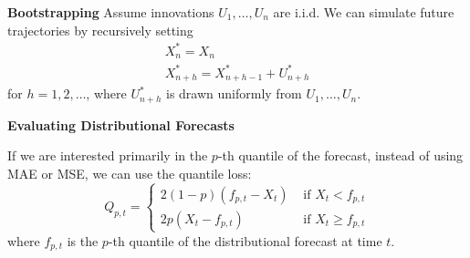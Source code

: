 \documentclass[a4paper]{article}
\newcommand{\subheading}[1]{{\scriptsize\textbf{#1}}}
\begin{document}
\begin{multicols*}{4}
\subheading{Bootstrapping}
Assume innovations $U_{1}, \ldots, U_{n}$ are i.i.d. We can simulate future trajectories by recursively setting
$$
\begin{gathered}
X_{n}^{*}=X_{n} \\
X_{n+h}^{*}=X_{n+h-1}^{*}+U_{n+h}^{*}
\end{gathered}
$$
for $h=1,2, \ldots$, where $U_{n+h}^{*}$ is drawn uniformly from $U_{1}, \ldots, U_{n}$. 

\subheading{Evaluating Distributional Forecasts}

If we are interested primarily in the $p$-th quantile of the forecast, instead of using MAE or MSE, we can use the quantile loss:
$$
Q_{p, t}= \begin{cases}2(1-p)\left(f_{p, t}-X_{t}\right) & \text { if } X_{t}<f_{p, t} \\ 2 p\left(X_{t}-f_{p, t}\right) & \text { if } X_{t} \geq f_{p, t}\end{cases}
$$
where $f_{p, t}$ is the $p$-th quantile of the distributional forecast at time $t$.

\end{multicols*}
\end{document}
